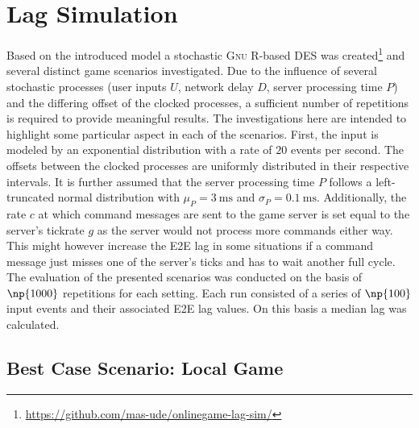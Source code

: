 \section{Lag Simulation}
\label{sec:simulation}

Based on the introduced model a stochastic \textsc{Gnu R}-based \gls{DES} was created\footnote{\url{https://github.com/mas-ude/onlinegame-lag-sim/}} and several distinct game scenarios investigated. Due to the influence of several stochastic processes (user inputs $U$, network delay $D$, server processing time $P$) and the differing offset of the clocked processes, a sufficient number of repetitions is required to provide meaningful results. The investigations here are intended to highlight some particular aspect in each of the scenarios. First, the input is modeled by an exponential distribution with a rate of $20$ events per second. The offsets between the clocked processes are uniformly distributed in their respective intervals. It is further assumed that the server processing time $P$ follows a left-truncated normal distribution with $\mu_P = \SI{3}{\milli\second}$ and $\sigma_P = \SI{0.1}{\milli\second}$. Additionally, the rate $c$ at which command messages are sent to the game server is set equal to the server's tickrate $g$ as the server would not process more commands either way. This might however increase the \gls{E2E} lag in some situations if a command message just misses one of the server's ticks and has to wait another full cycle. The evaluation of the presented scenarios was conducted on the basis of $\np{1000}$ repetitions for each setting. Each run consisted of a series of $\np{100}$ input events and their associated \gls{E2E} lag values. On this basis a median lag was calculated.


\subsection{Best Case Scenario: Local Game}
\label{subsec:local-game}

